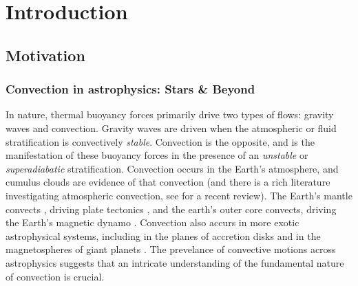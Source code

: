 \chapter{Introduction}
\label{introchap}

\section{Motivation}

\subsection{Convection in astrophysics: Stars \& Beyond}
\label{sct:convective_abundance}
In nature, thermal buoyancy forces primarily drive two types of flows: gravity waves and convection.
Gravity waves are driven when the atmospheric or fluid stratification is convectively \emph{stable}.
Convection is the opposite, and is the manifestation of these buoyancy forces in the presence of an \emph{unstable} or \emph{superadiabatic} stratification.
Convection occurs in the Earth's atmosphere, and cumulus clouds are evidence of that convection (and there is a rich literature investigating atmospheric convection, see \citet{yano2014} for a recent review).
The Earth's mantle convects \citep{schubert&all2001}, driving plate tectonics \citep{bercovici2003}, and the earth's outer core convects, driving the Earth's magnetic dynamo \citep{christensen2011}.
Convection also accurs in more exotic astrophysical systems, including in the planes of accretion disks \citep{held&latter2018} and in the magnetospheres of giant planets \citep{thomsen&all2012}.
The prevelance of convective motions across astrophysics suggests that an intricate understanding of the fundamental nature of convection is crucial.

